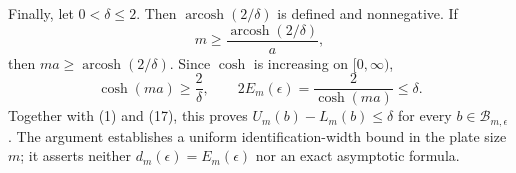 Finally, let \(0<\delta\leq2\).  Then \(\operatorname{arcosh}(2/\delta)\) is defined and nonnegative.  If
\[
 m\geq\frac{\operatorname{arcosh}(2/\delta)}{a},
\]
then \(ma\geq\operatorname{arcosh}(2/\delta)\).  Since \(\cosh\) is increasing on \([0,\infty)\),
\[
 \cosh(ma)\geq\frac{2}{\delta},
 \qquad
 2E_m(\epsilon)=\frac{2}{\cosh(ma)}\leq\delta.
\]
Together with (1) and (17), this proves \(U_m(b)-L_m(b)\leq\delta\) for every \(b\in\mathcal B_{m,\epsilon}\).  The argument establishes a uniform identification-width bound in the plate size \(m\); it asserts neither \(d_m(\epsilon)=E_m(\epsilon)\) nor an exact asymptotic formula.